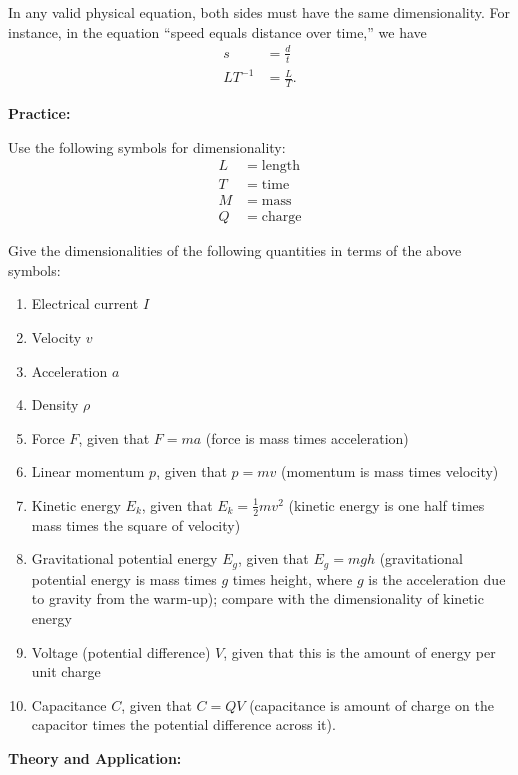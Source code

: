 \documentclass{article}
\begin{document}
In any valid physical equation, both sides must have the same dimensionality. For instance, in the equation ``speed equals distance over time,'' we have
\begin{align*}
	s&=\frac{d}{t}\\
	LT^{-1}&=\frac{L}{T}.
\end{align*}

\clearpage




\textbf{Practice:}\bigskip

Use the following symbols for dimensionality:
\begin{align*}
	L&=\mathrm{length}\\
	T&=\mathrm{time}\\
	M&=\mathrm{mass}\\
	Q&=\mathrm{charge}
\end{align*}

Give the dimensionalities of the following quantities in terms of the above symbols:

\begin{enumerate}
	\item Electrical current $I$
	\item Velocity $v$
	\item Acceleration $a$
	\item Density $\rho$
	\item Force $F$, given that $F=ma$ (force is mass times acceleration)
	\item Linear momentum $p$, given that $p=mv$ (momentum is mass times velocity)
	\item Kinetic energy $E_k$, given that $E_k=\frac{1}{2}mv^2$ (kinetic energy is one half times mass times the square of velocity)
	\item Gravitational potential energy $E_g$, given that $E_g=mgh$ (gravitational potential energy is mass times $g$ times height, where $g$ is the acceleration due to gravity from the warm-up); compare with the dimensionality of kinetic energy
	\item Voltage (potential difference) $V$, given that this is the amount of energy per unit charge
	\item Capacitance $C$, given that $C=QV$ (capacitance is amount of charge on the capacitor times the potential difference across it).
\end{enumerate}

\clearpage




\textbf{Theory and Application:}\bigskip
\end{document}
